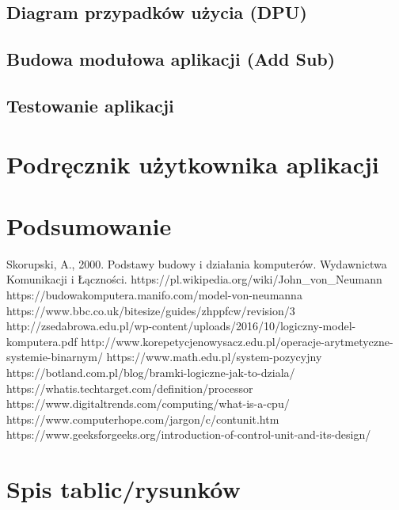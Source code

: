\documentclass[12pt, a4paper, onside, polish]{article}				%
\begin{document}
\subsection{Diagram przypadków użycia (DPU)}
\cleardoublepage

\subsection{Budowa modułowa aplikacji (Add Sub)}
\cleardoublepage

\subsection{Testowanie aplikacji}
\cleardoublepage



\section{Podręcznik użytkownika aplikacji}
\cleardoublepage




\section{Podsumowanie}
\cleardoublepage



\begin{thebibliography}{100}
 Skorupski, A., 2000. Podstawy budowy i działania komputerów. Wydawnictwa Komunikacji i Łączności.
\bibitem{} https://pl.wikipedia.org/wiki/John_von_Neumann 
\bibitem{} https://budowakomputera.manifo.com/model-von-neumanna 
\bibitem{} https://www.bbc.co.uk/bitesize/guides/zhppfcw/revision/3 
\bibitem{} http://zsedabrowa.edu.pl/wp-content/uploads/2016/10/logiczny-model-komputera.pdf 
\bibitem{} http://www.korepetycjenowysacz.edu.pl/operacje-arytmetyczne-systemie-binarnym/
\bibitem{} https://www.math.edu.pl/system-pozycyjny
\bibitem{} https://botland.com.pl/blog/bramki-logiczne-jak-to-dziala/
\bibitem{} https://whatis.techtarget.com/definition/processor
\bibitem{} https://www.digitaltrends.com/computing/what-is-a-cpu/
\bibitem{} https://www.computerhope.com/jargon/c/contunit.htm
\bibitem{} https://www.geeksforgeeks.org/introduction-of-control-unit-and-its-design/

\end{thebibliography}


\cleardoublepage
\section{Spis tablic/rysunków}
\begin{appendix}
\listoftables
\listoffigures
\end{appendix}

\cleardoublepage
\end{document}
